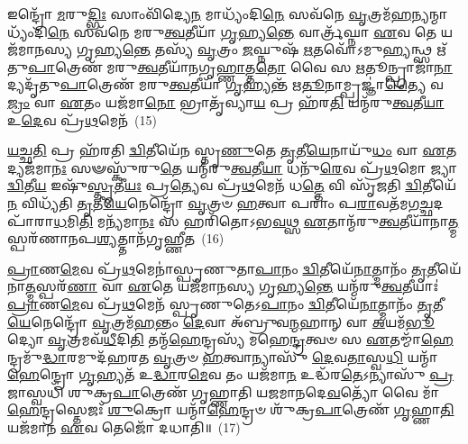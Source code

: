 {\anuvakamend[{𑌤𑌸𑍍𑌮𑌾᳴\-\ul{𑌦}\-𑌸𑌾𑌵𑌾᳴\-\ul{𑌦𑌿}\-𑌤𑍍𑌯\-\ul{𑌸𑍍𑌤𑍍𑌰𑌿}\-\-\ul{𑍞}\-𑌶𑌚𑍍𑌚᳴}]}%

𑌇𑌨𑍍𑌦𑍍𑌰𑍋᳴ \ul{𑌮}\-𑌰𑍁\-\ul{𑌦𑍍𑌭𑌿𑌃} 𑌸𑌾𑌂𑌵𑌿᳴𑌦𑍍𑌯𑍇\-\ul{𑌨} 𑌮𑌾𑌧𑍍𑌯𑌂᳴𑌦𑌿\-\ul{𑌨𑍇} 𑌸𑌵᳴𑌨𑍇 \ul{𑌵𑍃}\-𑌤𑍍𑌰𑌮᳴\-\ul{𑌹}\-\-\ul{𑌨𑍍}\-𑌯𑌨𑍍𑌮𑌾𑌧𑍍𑌯𑌂᳴𑌦𑌿\-\ul{𑌨𑍇} 𑌸𑌵᳴𑌨𑍇 𑌮𑌰𑍁\-\ul{𑌤𑍍𑌵}\-𑌤𑍀𑌯𑌾᳴ \ul{𑌗𑍃}\-𑌹𑍍𑌯\-\ul{𑌨𑍍𑌤𑍇} 𑌵𑌾𑌰𑍍𑌤𑍍𑌰᳴𑌘𑍍𑌨𑌾 \ul{𑌏}\-𑌵 𑌤𑍇 𑌯𑌜᳴𑌮𑌾𑌨𑌸𑍍𑌯 𑌗𑍃𑌹𑍍𑌯\-\ul{𑌨𑍍𑌤𑍇} 𑌤𑌸𑍍𑌯᳴ \ul{𑌵𑍃}\-𑌤𑍍𑌰𑌂 \ul{𑌜}\-𑌘𑍍𑌨𑍁𑌷᳴ \ul{𑌋}\-𑌤𑌵𑍋᳴\-𑌽𑌮𑍁\-\ul{𑌹𑍍𑌯}\-𑌨𑍍𑌥𑍍𑌸 𑌋᳴𑌤𑍁\-\ul{𑌪𑌾}\-𑌤𑍍𑌰𑍇𑌣᳴ 𑌮𑌰𑍁\-\ul{𑌤𑍍𑌵}\-𑌤𑍀𑌯𑌾᳴𑌨𑌗𑍃\-\ul{𑌹𑍍𑌣𑌾}\-𑌤𑍍𑌤\-\ul{𑌤𑍋} 𑌵𑍈 𑌸 \ul{𑌋}\-𑌤𑍂𑌨𑍍𑌪𑍍𑌰𑌾𑌜𑌾᳴\-\ul{𑌨𑌾}\-𑌦𑍍𑌯𑌦𑍃᳴𑌤𑍁\-\ul{𑌪𑌾}\-𑌤𑍍𑌰𑍇𑌣᳴ 𑌮𑌰𑍁\-\ul{𑌤𑍍𑌵}\-𑌤𑍀𑌯𑌾᳴ \ul{𑌗𑍃}\-𑌹𑍍𑌯𑌨𑍍𑌤᳴ 𑌋\-\ul{𑌤𑍂}\-𑌨𑌾𑌮𑍍𑌪𑍍𑌰𑌜𑍍𑌞𑌾॑\-\ul{𑌤𑍍𑌯𑍈} 𑌵\-\ul{𑌜𑍍𑌰𑌂} 𑌵𑌾 \ul{𑌏}\-𑌤𑌂 𑌯𑌜᳴𑌮𑌾\-\ul{𑌨𑍋} 𑌭𑍍𑌰𑌾𑌤𑍃᳴𑌵𑍍𑌯𑌾\-\ul{𑌯} 𑌪𑍍𑌰 𑌹᳴𑌰\-\ul{𑌤𑌿} 𑌯𑌨𑍍𑌮᳴𑌰𑍁\-\ul{𑌤𑍍𑌵}\-𑌤𑍀\-\ul{𑌯𑌾} 𑌉\-\ul{𑌦𑍇}\-𑌵 𑌪𑍍𑌰᳴\-\ul{𑌥}\-𑌮𑍇𑌨᳴~(15)

\-\ul{𑌯}\-\-\ul{𑌚𑍍𑌛}\-\-\ul{𑌤𑌿} 𑌪𑍍𑌰 𑌹᳴𑌰𑌤𑌿 \ul{𑌦𑍍𑌵𑌿}\-𑌤𑍀𑌯𑍇᳴𑌨 𑌸𑍍𑌤𑍃\-\ul{𑌣𑍁}\-𑌤𑍇 \ul{𑌤𑍃}\-𑌤𑍀\-\ul{𑌯𑍇}\-𑌨𑌾𑌯𑍁᳴\-\ul{𑌧𑌂} 𑌵𑌾 \ul{𑌏}\-𑌤𑌦𑍍𑌯𑌜᳴𑌮𑌾\-\ul{𑌨𑌃} 𑌸𑍟𑌸𑍍𑌕𑍁᳴𑌰𑍁\-\ul{𑌤𑍇} 𑌯𑌨𑍍𑌮᳴𑌰𑍁\-\ul{𑌤𑍍𑌵}\-𑌤𑍀\-\ul{𑌯𑌾} 𑌧𑌨𑍁᳴\-\ul{𑌰𑍇}\-𑌵 𑌪𑍍𑌰᳴\-\ul{𑌥}\-𑌮𑍋 𑌜𑍍𑌯𑌾 \ul{𑌦𑍍𑌵𑌿}\-𑌤𑍀\-\ul{𑌯} 𑌇𑌷𑍁᳴\-\ul{𑌸𑍍𑌤𑍃}\-𑌤𑍀\-\ul{𑌯𑌃} 𑌪𑍍𑌰\-\ul{𑌤𑍍𑌯𑍇}\-𑌵 𑌪𑍍𑌰᳴\-\ul{𑌥}\-𑌮𑍇𑌨᳴ 𑌧\-\ul{𑌤𑍍𑌤𑍇} 𑌵𑌿 𑌸𑍃᳴𑌜𑌤𑌿 \ul{𑌦𑍍𑌵𑌿}\-𑌤𑍀𑌯𑍇᳴\-\ul{𑌨} 𑌵𑌿𑌧𑍍𑌯᳴𑌤𑌿 \ul{𑌤𑍃}\-𑌤𑍀\-\ul{𑌯𑍇}\-𑌨𑍇𑌨𑍍𑌦𑍍𑌰𑍋᳴ \ul{𑌵𑍃}\-𑌤𑍍𑌰𑍞 \ul{𑌹}\-𑌤𑍍𑌵𑌾 𑌪𑌰𑌾𑌂॑ 𑌪\-\ul{𑌰𑌾}\-𑌵𑌤᳴𑌮𑌗\-\ul{𑌚𑍍𑌛}\-𑌦𑌪𑌾᳴𑌰𑌾\-\ul{𑌧}\-𑌮𑌿\-\ul{𑌤𑌿} 𑌮𑌨𑍍𑌯᳴𑌮𑌾\-\ul{𑌨𑌃} 𑌸 𑌹𑌰𑌿᳴𑌤𑍋\-𑌽𑌭\-\ul{𑌵}\-𑌥𑍍𑌸 \ul{𑌏}\-𑌤𑌾𑌨𑍍𑌮᳴𑌰𑍁\-\ul{𑌤𑍍𑌵}\-𑌤𑍀𑌯𑌾᳴𑌨𑌾\-\ul{𑌤𑍍𑌮}\-𑌸𑍍𑌪𑌰᳴𑌣𑌾𑌨𑌪\-\ul{𑌶𑍍𑌯}\-𑌤𑍍𑌤𑌾𑌨᳴𑌗𑍃𑌹𑍍𑌣𑍀𑌤~(16)

\-\ul{𑌪𑍍𑌰𑌾}\-𑌣\-\ul{𑌮𑍇}\-𑌵 𑌪𑍍𑌰᳴\-\ul{𑌥}\-𑌮𑍇𑌨𑌾॑𑌸𑍍𑌪𑍃𑌣𑍁𑌤𑌾\-\ul{𑌪𑌾}\-𑌨𑌂 \ul{𑌦𑍍𑌵𑌿}\-𑌤𑍀𑌯𑍇᳴\-\ul{𑌨𑌾}\-𑌤𑍍𑌮𑌾𑌨𑌂᳴ \ul{𑌤𑍃}\-𑌤𑍀𑌯𑍇᳴𑌨𑌾\-\ul{𑌤𑍍𑌮}\-𑌸𑍍𑌪𑌰᳴\-\ul{𑌣𑌾} 𑌵𑌾 \ul{𑌏}\-𑌤𑍇 𑌯𑌜᳴𑌮𑌾𑌨𑌸𑍍𑌯 𑌗𑍃𑌹𑍍𑌯\-\ul{𑌨𑍍𑌤𑍇} 𑌯𑌨𑍍𑌮᳴𑌰𑍁\-\ul{𑌤𑍍𑌵}\-𑌤𑍀𑌯𑌾𑌃॑ \ul{𑌪𑍍𑌰𑌾}\-𑌣\-\ul{𑌮𑍇}\-𑌵 𑌪𑍍𑌰᳴\-\ul{𑌥}\-𑌮𑍇𑌨᳴ 𑌸𑍍𑌪𑍃𑌣𑍁𑌤𑍇\-𑌽\-\ul{𑌪𑌾}\-𑌨𑌂 \ul{𑌦𑍍𑌵𑌿}\-𑌤𑍀𑌯𑍇᳴\-\ul{𑌨𑌾}\-𑌤𑍍𑌮𑌾𑌨𑌂᳴ \ul{𑌤𑍃}\-𑌤𑍀\-\ul{𑌯𑍇}\-𑌨𑍇𑌨𑍍𑌦𑍍𑌰𑍋᳴ \ul{𑌵𑍃}\-𑌤𑍍𑌰𑌮᳴\-\ul{𑌹}\-𑌨𑍍𑌤𑌂 \ul{𑌦𑍇}\-𑌵𑌾 𑌅᳴𑌬𑍍𑌰𑍁𑌵\-\ul{𑌨𑍍𑌮}\-𑌹𑌾𑌨𑍍 𑌵𑌾 \ul{𑌅}\-𑌯𑌮᳴\-\ul{𑌭𑍂}\-𑌦𑍍𑌯𑍋 \ul{𑌵𑍃}\-𑌤𑍍𑌰𑌮𑌵᳴\-\ul{𑌧𑍀}\-𑌦𑌿\-\ul{𑌤𑌿} 𑌤𑌨𑍍𑌮᳴\-\ul{𑌹𑍇}\-𑌨𑍍𑌦𑍍𑌰𑌸𑍍𑌯᳴ 𑌮𑌹𑍇\-\ul{𑌨𑍍𑌦𑍍𑌰}\-𑌤𑍍𑌵𑍞 𑌸 \ul{𑌏}\-𑌤𑌮𑍍𑌮𑌾᳴\-\ul{𑌹𑍇}\-𑌨𑍍𑌦𑍍𑌰𑌮𑍁᳴\-\ul{𑌦𑍍𑌧𑌾}\-𑌰𑌮𑍁𑌦᳴𑌹𑌰𑌤 \ul{𑌵𑍃}\-𑌤𑍍𑌰𑍞 \ul{𑌹}\-𑌤𑍍𑌵𑌾𑌨𑍍𑌯𑌾𑌸𑍁᳴ \ul{𑌦𑍇}\-𑌵\-\ul{𑌤𑌾}\-𑌸𑍍𑌵\-\ul{𑌧𑌿} 𑌯𑌨𑍍𑌮𑌾᳴\-\ul{𑌹𑍇}\-𑌨𑍍𑌦𑍍𑌰𑍋 \ul{𑌗𑍃}\-𑌹𑍍𑌯𑌤᳴ 𑌉\-\ul{𑌦𑍍𑌧𑌾}\-𑌰\-\ul{𑌮𑍇}\-𑌵 𑌤𑌂 𑌯𑌜᳴𑌮𑌾\-\ul{𑌨} 𑌉𑌦𑍍𑌧᳴𑌰\-\ul{𑌤𑍇}\-\-𑌽𑌨𑍍𑌯𑌾𑌸𑍁᳴ \ul{𑌪𑍍𑌰}\-𑌜𑌾𑌸𑍍𑌵𑌧𑌿᳴ 𑌶𑍁𑌕𑍍𑌰\-\ul{𑌪𑌾}\-𑌤𑍍𑌰𑍇𑌣᳴ 𑌗𑍃𑌹𑍍𑌣𑌾𑌤𑌿 𑌯𑌜𑌮𑌾𑌨𑌦𑍇\-\ul{𑌵}\-𑌤𑍍𑌯𑍋᳴ 𑌵𑍈 𑌮𑌾᳴\-\ul{𑌹𑍇}\-𑌨𑍍𑌦𑍍𑌰𑌸𑍍𑌤𑍇𑌜𑌃᳴ \ul{𑌶𑍁}\-𑌕𑍍𑌰𑍋 𑌯𑌨𑍍𑌮𑌾᳴\-\ul{𑌹𑍇}\-𑌨𑍍𑌦𑍍𑌰𑍞 𑌶𑍁᳴𑌕𑍍𑌰\-\ul{𑌪𑌾}\-𑌤𑍍𑌰𑍇𑌣᳴ \ul{𑌗𑍃}\-𑌹𑍍𑌣𑌾\-\ul{𑌤𑌿} 𑌯𑌜᳴𑌮𑌾𑌨 \ul{𑌏}\-𑌵 𑌤𑍇𑌜𑍋᳴ 𑌦𑌧𑌾𑌤𑌿॥~(17)

{\anuvakamend[{\-\ul{𑌪𑍍𑌰}\-\-\ul{𑌥}\-𑌮𑍇𑌨𑌾᳴𑌗𑍃𑌹𑍍𑌣𑍀𑌤 \ul{𑌦𑍇}\-𑌵𑌤𑌾॑\-\ul{𑌸𑍍𑌵}\-𑌷𑍍𑌟𑌾𑌵𑌿𑍞᳴𑌶𑌤𑌿𑌶𑍍𑌚}]}%

